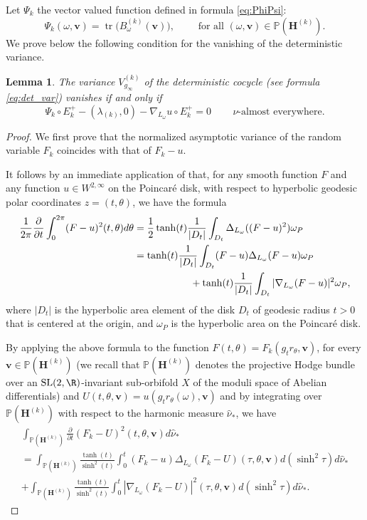 \documentclass[10pt]{amsart}
\DeclareMathOperator{\tr}{tr}
\theoremstyle{plain}
\newtheorem{lemma}[thm]{Lemma}
\theoremstyle{definition}
\numberwithin{equation}{subsection}
\newcommand\bP{\mathbb{P}}
\newcommand{\SL}{\mathrm{SL}}
\let\gradient\nabla
\let\laplacian\Delta
\newcommand{\bfH}{\boldsymbol{H}}
\newcommand{\bfv}{\boldsymbol{v}}
\begin{document}
Let $\Psi_k$ the vector valued function defined in formula \eqref{eq:PhiPsi}:
\[
\Psi_k(\omega, {\bfv}) = \tr \bigl(B^{(k)}_\omega ({\bfv}) \bigr), \qquad \text{ for all } (\omega, {\bfv}) \in \bP(\bfH^{(k)}).
\]
We prove below the following condition for the vanishing of the deterministic variance.
\begin{lemma}
\label{lem:det_var}
The variance $V^{(k)}_{g_\infty}$ of the deterministic cocycle (see formula \eqref{eq:det_var}) vanishes if and only if
\[
\Psi_k \circ E^+_k - (\lambda_{(k)},0) -\gradient_{L_\omega} u \circ E_k^+ =0\, \qquad \text{$\nu$-almost everywhere}.
\]
\end{lemma}
\begin{proof}
We first prove that the normalized asymptotic variance of the random variable $F_k$ coincides with that of $F_k -u$.

It follows by an immediate application of \cite[Lem.\,3.1]{For02} that, for any smooth function $F$ and any function $u\in W^{2,\infty}$ on the Poincaré disk, with respect to hyperbolic geodesic polar coordinates $z=(t,\theta)$, we have the formula
\begin{align*}
\frac{1}{2\pi} \frac{\partial}{\partial t} \int_0^{2\pi} (F-u)^2(t,\theta)d\theta &= \frac{1}{2} \tanh(t) \frac{1}{|D_t|} \int_{D_t} \laplacian_{L_\omega}((F-u)^2) \omega_P \\
&= \tanh(t) \frac{1}{|D_t|} \int_{D_t} (F-u)\laplacian_{L_\omega}(F-u) \omega_P \\
&\hspace*{2cm}+ \tanh(t) \frac{1}{|D_t|} \int_{D_t} |\gradient_{L_\omega}(F-u)|^2 \omega_P,
\end{align*}
where $|D_t|$ is the hyperbolic area element of the disk $D_t$ of geodesic radius $t>0$ that is centered at the origin, and $\omega_P$ is the hyperbolic area on the Poincaré disk.

By applying the above formula to the function $F(t,\theta)= F_k (g_t r_\theta, {\bfv})$, for every ${\bfv} \in \bP(\bfH^{(k)})$ (we recall that $\bP(\bfH^{(k)})$ denotes the projective Hodge bundle over an $\SL(2, \R)$-invariant sub-orbifold $X$ of the moduli space of Abelian differentials)
and $U(t, \theta, \bfv) = u(g_t r_\theta (\omega), \bfv)$ and by integrating over $\bP(\bfH^{(k)})$ with respect to the harmonic measure $\hat \nu_*$, we have
\begin{multline*}
\int_{\bP(\bfH^{(k)})} \frac{\partial}{\partial t} (F_k-U)^2 (t,\theta, \bfv)d\hat{\nu}_* \\
= \int_{\bP(\bfH^{(k)})} \frac{\tanh(t)}{\sinh^2(t)} \int_{0}^{t} (F_k-u)\laplacian_{L_\omega}(F_k-U)(\tau,\theta, \bfv) d(\sinh^2\tau)d\hat{\nu}_* \\
+ \int_{\bP(\bfH^{(k)})} \frac{\tanh(t)}{\sinh^2(t)} \int_{0}^{t} |\gradient_{L_\omega}(F_k-U)|^2(\tau,\theta, \bfv) d(\sinh^2\tau)d\hat{\nu}_*.
\end{multline*}


\end{proof}
\end{document}
